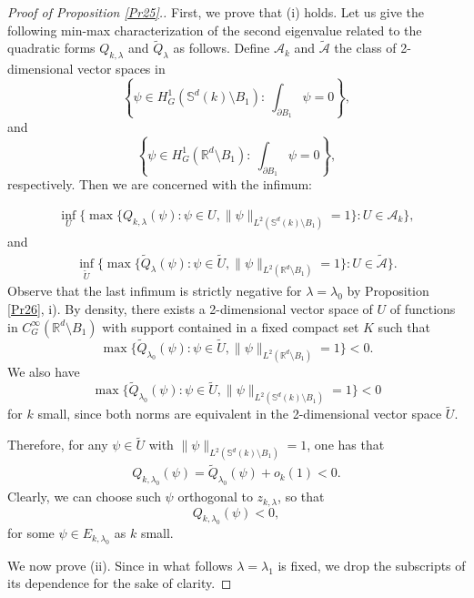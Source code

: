 \documentclass[reqno]{amsart}
\def\dis{\displaystyle}
\numberwithin{equation}{section}
\newenvironment{key words}{\textbf{Keywords}\mbox{  }}{ }
\begin{document}
\begin{proof}[Proof of Proposition \ref{Pr25}.]
	
First, we prove that (i) holds. Let us give the following min-max characterization of the second eigenvalue related to the quadratic forms $Q_{k, \lambda}$ and $\tilde{Q}_{\lambda}$ as follows. Define $\mathcal{A}_{k}$ and $\tilde{\mathcal{A}}$ the class of 2-dimensional vector spaces in
\[\left\{\psi\in H^1_G(\mathbb{S}^{d}(k)\setminus B_{1}): \ \dis\int_{\partial B_1}\psi=0\right\},\]
and
\[\left\{\psi\in H^1_G(\mathbb{R}^{d}\setminus B_{1}): \ \dis\int_{\partial B_1}\psi=0\right\},\]
respectively. Then we are concerned with the infimum:

\begin{align*}
 \inf\limits_{U}\{\max\{Q_{k, \lambda}(\psi):\psi\in U,\|\psi\|_{L^{2}(\mathbb{S}^{d}(k)\setminus B_{1})}=1\}:U\in\mathcal{A}_{k}\},
\end{align*} and
\begin{align*}
 \inf\limits_{\tilde{U}}\{\max\{\tilde{Q}_{\lambda}(\psi):\psi\in \tilde{U},\|\psi\|_{L^{2}(\mathbb{R}^{d}\setminus B_{1})}=1\}:U\in\tilde{\mathcal{A} } \}.
\end{align*}
Observe that the last infimum is strictly negative for $\lambda= \lambda_0$ by Proposition \ref{Pr26}, i).
By density, there exists a 2-dimensional vector space of $U$ of functions in $C^{\infty}_{G}(\mathbb{R}^{d}\setminus B_{1})$ with support contained in a fixed compact set $K$ such that
\[\max\{\tilde{Q}_{\lambda_{0}}(\psi):\psi\in \tilde{U},\|\psi\|_{L^{2}(\mathbb{R}^{d}\setminus B_{1})}=1\}<0.\]
We also have
\[\max\{\tilde{Q}_{\lambda_{0}}(\psi):\psi\in \tilde{U},\|\psi\|_{L^{2}(\mathbb{S}^{d}(k)\setminus B_{1})}=1\}<0\]
for $k$ small, since both norms are equivalent in the 2-dimensional vector space $\tilde{U}.$

 Therefore, for any $\psi\in \tilde{U}$ with $\|\psi\|_{L^{2}(\mathbb{S}^{d}(k)\setminus B_{1})}=1$, one has that
 \begin{align*}
 Q_{k,\lambda_{0}}(\psi) =\tilde{Q}_{\lambda_{0}}(\psi) + o_k(1) <0.
\end{align*}
Clearly, we can choose such $\psi$ orthogonal to $z_{k,\lambda}$, so that \[Q_{k,\lambda_{0}}(\psi)<0,\]
 for some $\psi\in E_{k, \lambda_{0}}$ as $k$ small.

\bigskip

We now prove (ii). Since in what follows $\lambda = \lambda_1$ is fixed, we drop the subscripts of its dependence for the sake of clarity.


\end{proof}
\end{document}

